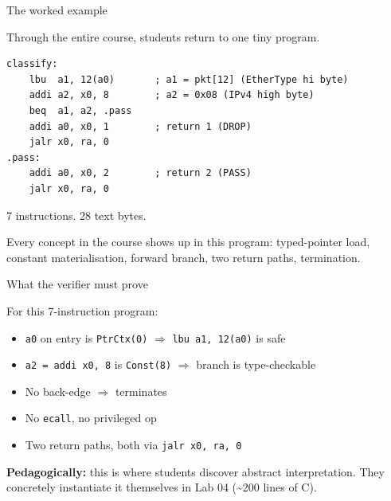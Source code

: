 \documentclass[aspectratio=169,11pt]{beamer}
\begin{document}
\begin{frame}[fragile]{The worked example}

Through the entire course, students return to one tiny program.

\begin{lstlisting}[language=rvasm]
classify:
    lbu  a1, 12(a0)       ; a1 = pkt[12] (EtherType hi byte)
    addi a2, x0, 8        ; a2 = 0x08 (IPv4 high byte)
    beq  a1, a2, .pass
    addi a0, x0, 1        ; return 1 (DROP)
    jalr x0, ra, 0
.pass:
    addi a0, x0, 2        ; return 2 (PASS)
    jalr x0, ra, 0
\end{lstlisting}

\pause

7 instructions.  28 text bytes.

\pause

Every concept in the course shows up in this program:
typed-pointer load, constant materialisation, forward branch,
two return paths, termination.

\end{frame}

\begin{frame}{What the verifier must prove}

For this 7-instruction program:

\begin{itemize}
  \item \texttt{a0} on entry is \texttt{PtrCtx(0)}
        $\Rightarrow$ \texttt{lbu a1, 12(a0)} is safe
  \item \texttt{a2 = addi x0, 8} is \texttt{Const(8)}
        $\Rightarrow$ branch is type-checkable
  \item No back-edge $\Rightarrow$ terminates
  \item No \texttt{ecall}, no privileged op
  \item Two return paths, both via \texttt{jalr x0, ra, 0}
\end{itemize}

\pause

\textbf{Pedagogically:} this is where students discover
abstract interpretation.  They concretely instantiate it
themselves in Lab 04 (\textasciitilde 200 lines of C).

\end{frame}
\end{document}
